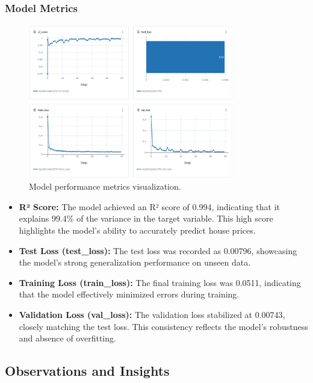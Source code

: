 \subsubsection{Model Metrics}

\begin{figure}[H]
    \centering
    \includegraphics[width=0.8\textwidth]{images/results.png}
    \caption{Model performance metrics visualization.}
    \label{fig:results}
\end{figure}

\begin{itemize}
    \item \textbf{R² Score:} The model achieved an R² score of 0.994, indicating that it explains 99.4\% of the variance in the target variable. This high score highlights the model's ability to accurately predict house prices.
    \item \textbf{Test Loss (test\_loss):} The test loss was recorded as 0.00796, showcasing the model's strong generalization performance on unseen data.
    \item \textbf{Training Loss (train\_loss):} The final training loss was 0.0511, indicating that the model effectively minimized errors during training.
    \item \textbf{Validation Loss (val\_loss):} The validation loss stabilized at 0.00743, closely matching the test loss. This consistency reflects the model's robustness and absence of overfitting.
\end{itemize}

\subsection{Observations and Insights}

